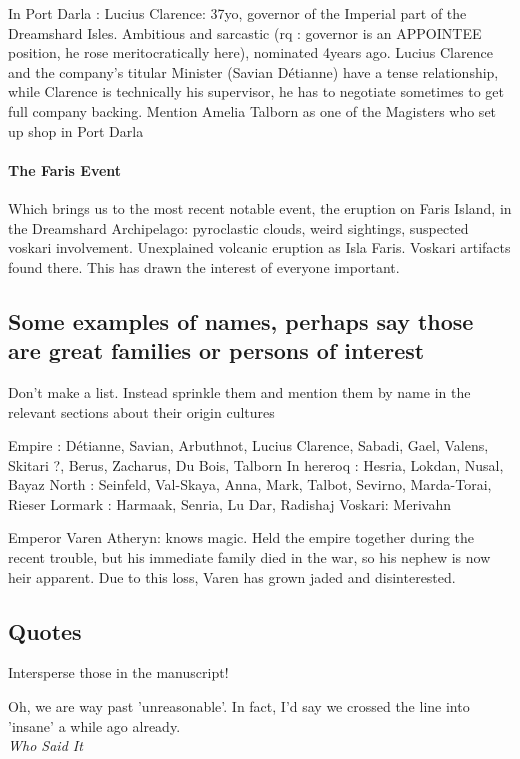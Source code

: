 In Port Darla : Lucius Clarence: 37yo, governor of the Imperial part of the Dreamshard Isles. Ambitious and sarcastic (rq : governor is an APPOINTEE position, he rose meritocratically here), nominated 4years ago. Lucius Clarence and the company's titular Minister (Savian Détianne) have a tense relationship, while Clarence is technically his supervisor, he has to negotiate sometimes to get full company backing. Mention Amelia Talborn as one of the Magisters who set up shop in Port Darla

\paragraph{The Faris Event}

Which brings us to the most recent notable event, the eruption on Faris Island, in the Dreamshard Archipelago: pyroclastic clouds, weird sightings, suspected voskari involvement. Unexplained volcanic eruption as Isla Faris. Voskari artifacts found there. This has drawn the interest of everyone important.


\subsection{Some examples of names, perhaps say those are great families or persons of interest}

Don't make a list. Instead sprinkle them and mention them by name in the relevant sections about their origin cultures

Empire : Détianne, Savian, Arbuthnot, Lucius Clarence, Sabadi, Gael, Valens, Skitari ?, Berus, Zacharus, Du Bois, Talborn
In hereroq : Hesria, Lokdan, Nusal, Bayaz
North : Seinfeld, Val-Skaya, Anna, Mark, Talbot, Sevirno, Marda-Torai, Rieser
Lormark : Harmaak, Senria, Lu Dar, Radishaj
Voskari: Merivahn

Emperor Varen Atheryn: knows magic. Held the empire together during the recent trouble, but his immediate family died in the war, so his nephew is now heir apparent. Due to this loss, Varen has grown jaded and disinterested.

\subsection{Quotes}

Intersperse those in the manuscript!

\begin{rpg-quotebox}
Oh, we are way past 'unreasonable'. In fact, I'd say we crossed the line into 'insane' a while ago already. \\ \textendash \textit{Who Said It}
\end{rpg-quotebox}

